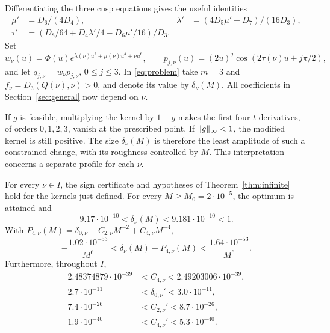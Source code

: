 Differentiating the three cusp equations gives the useful identities
\begin{align}
 \mu'&=D_6/(4D_4),&
 \lambda'&=(4D_5\mu'-D_7)/(16D_3),\nonumber\\
 \tau'&=(D_8/64+D_4\lambda'/4-D_6\mu'/16)/D_3 .\label{eq:velocity}
\end{align}
Set
\[
 w_\nu(u)=\Phi(u)e^{\lambda(\nu)u^2+\mu(\nu)u^4+\nu u^6},\qquad
 p_{j,\nu}(u)=(2u)^j\cos(2\tau(\nu)u+j\pi/2),
\]
and let \(q_{j,\nu}=w_\nu p_{j,\nu}\), \(0\leq j\leq3\).
In \eqref{eq:problem} take \(m=3\) and
\(f_\nu=D_3(Q(\nu),\nu)>0\), and denote its value by \(\delta_\nu(M)\).
All coefficients in Section~\ref{sec:general} now depend on \(\nu\).

If \(g\) is feasible, multiplying the kernel by \(1-g\) makes the
first four \(t\)-derivatives, of orders \(0,1,2,3\), vanish at the
prescribed point. If \(\lVert g\rVert_\infty<1\), the modified kernel is still
positive. The size \(\delta_\nu(M)\) is therefore the least amplitude of
such a constrained change, with its roughness controlled by \(M\).
This interpretation concerns a separate profile for each \(\nu\).

\begin{theorem}\label{thm:theta}
For every \(\nu\in I\), the sign certificate and hypotheses of
Theorem~\ref{thm:infinite} hold for the kernels just defined.
For every \(M\geq M_0=2\cdot10^{-5}\), the optimum is attained and
\[
 9.17\cdot10^{-10}<\delta_\nu(M)<9.181\cdot10^{-10}<1 .
\]
With \(P_{4,\nu}(M)=\delta_{0,\nu}+C_{2,\nu}M^{-2}+C_{4,\nu}M^{-4}\),
\begin{equation}\label{eq:thetaerror}
 -\frac{1.02\cdot10^{-53}}{M^6}
 <\delta_\nu(M)-P_{4,\nu}(M)
 <\frac{1.64\cdot10^{-53}}{M^6}.
\end{equation}
Furthermore, throughout \(I\),
\begin{align}
 2.48374879\cdot10^{-39}&<C_{4,\nu}<2.49203006\cdot10^{-39},
                                                        \label{eq:C4range}\\
 2.7\cdot10^{-11}&<\delta_{0,\nu}'<3.0\cdot10^{-11},\nonumber\\
 7.4\cdot10^{-26}&<C_{2,\nu}'<8.7\cdot10^{-26},\nonumber\\
 1.9\cdot10^{-40}&<C_{4,\nu}'<5.3\cdot10^{-40}.\label{eq:coefficientmotion}
\end{align}
\end{theorem}


